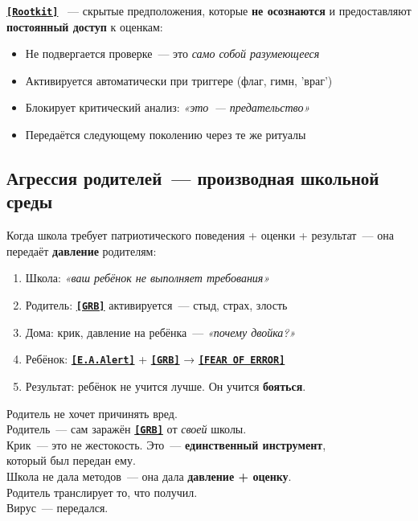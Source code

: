 \documentclass[13pt,a4paper]{article}
\newcommand{\termr}[1]{%
  \hyperref[glossary:#1]{\textbf{\texttt{\textcolor{sce-blue}{[#1]}}}}%
}
\newcommand{\kav}[1]{\textcolor{sce-red}{'#1'}}
\newenvironment{dialogbox}[1]{%
  \vspace{0.9em}
  \begin{mdframed}[
    linecolor=sce-gold, linewidth=4pt,
    topline=false, rightline=false, bottomline=false,
    backgroundcolor=bg-gold,
    innerleftmargin=12pt, innerrightmargin=10pt,
    innertopmargin=8pt, innerbottommargin=8pt,
    skipabove=0pt, skipbelow=0pt
  ]
  \noindent{\montserrat\normalsize\bfseries\color{sce-gold}#1}\par\vspace{4pt}%
  \ignorespaces
}{%
  \end{mdframed}
  \vspace{0.6em}
}
\begin{document}
\termr{Rootkit}~--- скрытые предположения, которые \textbf{не осознаются} и
предоставляют \textbf{постоянный доступ} к оценкам:
\begin{itemize}
  \item Не подвергается проверке~--- это \textit{само собой разумеющееся}
  \item Активируется автоматически при триггере (флаг, гимн, \kav{враг})
  \item Блокирует критический анализ: \textit{«это~--- предательство»}
  \item Передаётся следующему поколению через те же ритуалы
\end{itemize}

\subsection{Агрессия родителей~--- производная школьной среды}

Когда школа требует патриотического поведения + оценки + результат~---
она передаёт \textbf{давление} родителям:

\begin{enumerate}
  \item Школа: \textit{«ваш ребёнок не выполняет требования»}
  \item Родитель: \termr{GRB} активируется~--- стыд, страх, злость
  \item Дома: крик, давление на ребёнка~--- \textit{«почему двойка?»}
  \item Ребёнок: \termr{E.A.Alert} + \termr{GRB} → \termr{FEAR OF ERROR}
  \item Результат: ребёнок не учится лучше. Он учится \textbf{бояться}.
\end{enumerate}

\begin{dialogbox}{Ключевое наблюдение}
Родитель не хочет причинять вред.\\
Родитель~--- сам заражён \termr{GRB} от \textit{своей} школы.\\
Крик~--- это не жестокость. Это~--- \textbf{единственный инструмент},\\
который был передан ему.\\[0.3em]
Школа не дала методов~--- она дала \textbf{давление + оценку}.\\
Родитель транслирует то, что получил.\\[0.3em]
Вирус~--- передался.
\end{dialogbox}

\end{document}
